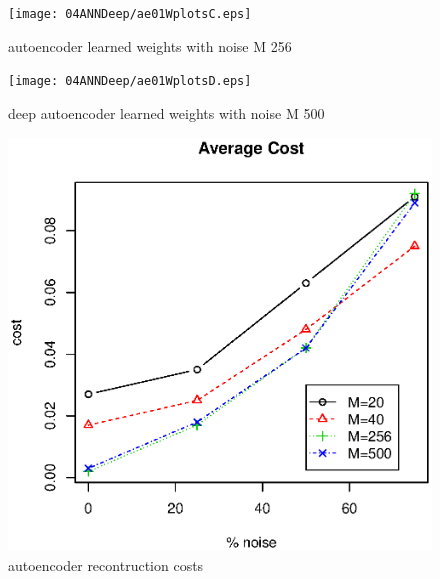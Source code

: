 %
\begin{figure}
\begin{center}
\texttt{[image: 04ANNDeep/ae01WplotsC.eps]}
\end{center}
\caption{autoencoder learned weights with noise M 256}
\label{fig: deep autoencoder learned weights with noise M 256}
\end{figure}
%

%
\begin{figure}
\begin{center}
\texttt{[image: 04ANNDeep/ae01WplotsD.eps]}
\end{center}
\caption{deep autoencoder learned weights with noise M 500}
\label{fig: deep autoencoder learned weights with noise M 500}
\end{figure}
%

%
\begin{figure}
\begin{center}
\includegraphics[width=6in]{04ANNDeep/aeReconstructionCostMNoise01.eps}
\end{center}
\caption{autoencoder recontruction costs}
\label{fig: deep autoencoder recontruction costs}
\end{figure}
%

